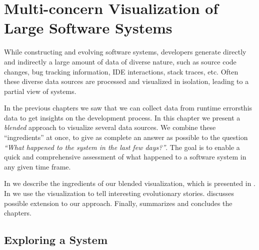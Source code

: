 

\chapter[Multi-concern Visualization of Large Software Systems]{Multi-concern Visualization of \\Large Software Systems}\label{ch:blend}

While constructing and evolving software systems, developers generate directly and indirectly a large amount of data of diverse nature, such as source code changes, bug tracking information, IDE interactions, stack traces, etc.
Often these diverse data sources are processed and visualized in isolation, leading to a partial view of systems.


In the previous chapters we saw that we can collect data from runtime errorsthis data to get insights on the development process.
In this chapter we present a \emph{blended} approach to visualize several data sources.
We combine these ``ingredients'' at once, to give as complete an answer as possible to the question \emph{``What happened to the system in the last few days?''}.
The goal is to enable a quick and comprehensive assessment of what happened to a software system in any given time frame.

\structure

In  we describe the ingredients of our blended visualization, which is presented in .
In  we use the visualization to tell interesting evolutionary stories.
 discusses possible extension to our approach.
Finally,  summarizes and concludes the chapters.

\newpage


\section{Exploring a System} \label{sec:blend-intro}

